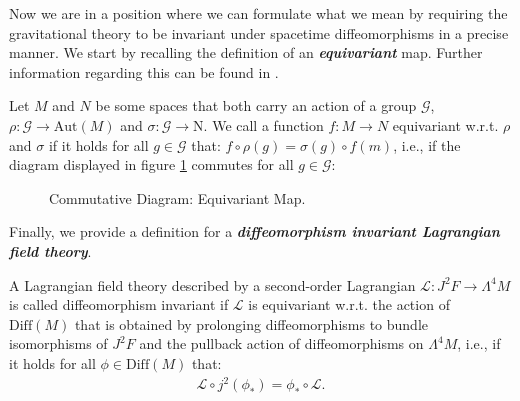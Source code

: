 Now we are in a position where we can formulate what we mean by requiring the gravitational theory to be invariant under spacetime diffeomorphisms in a precise manner. We start by recalling the definition of an \textit{\textbf{equivariant}} map. Further information regarding this can be found in \cite{doi:10.1142/3867}.
\begin{definition}[equivariance]
Let $M$ and $N$ be some spaces that both carry an action of a group $\mathcal{G}$, $\rho : \mathcal{G} \rightarrow \mathrm{Aut}(M)$ and $\sigma : \mathcal{G} \rightarrow \mathrm{N}$. We call a function $f : M \rightarrow N$ equivariant w.r.t. $\rho$ and $\sigma$ if it holds for all $g \in \mathcal{G}$ that: $f \circ \rho(g) = \sigma(g) \circ f(m)$, i.e., if the diagram displayed in figure \ref{EquiDia} commutes for all $g \in \mathcal{G}$:
\begin{figure}[hbt!]
\centering
{}
\caption{Commutative Diagram: Equivariant Map.}\label{EquiDia}
\end{figure}
\end{definition}
Finally, we provide a definition for a \textit{\textbf{diffeomorphism invariant Lagrangian field theory}}.
\begin{definition}
A Lagrangian field theory described by a second-order Lagrangian $\mathcal{L} : J^2F \rightarrow \Lambda^4 M$ is called diffeomorphism invariant if $\mathcal{L}$ is equivariant w.r.t. the action of $\mathrm{Diff}(M)$ that is obtained by prolonging diffeomorphisms to bundle isomorphisms of $J^2F$ and the pullback action of diffeomorphisms on $\Lambda^4M$, i.e., if it holds for all $\phi \in \mathrm{Diff}(M)$ that: 
\begin{align}
     \mathcal{L}\circ j^2(\phi_{\ast}) = \phi_{\ast} \circ \mathcal{L}.
\end{align}
\end{definition}

